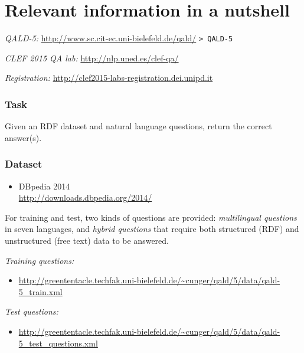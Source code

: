 \documentclass[a4paper]{article}
\begin{document}
{\newpage

\section{Relevant information in a nutshell}

{\em QALD-5:} \url{http://www.sc.cit-ec.uni-bielefeld.de/qald/} \texttt{> QALD-5}

{\em CLEF 2015 QA lab:} \url{http://nlp.uned.es/clef-qa/}

\emph{Registration:} \url{http://clef2015-labs-registration.dei.unipd.it}



\subsubsection*{Task}

Given an RDF dataset and natural language questions, return the correct answer(s). 

\subsubsection*{Dataset}

\begin{itemize} 
\item DBpedia 2014\\ \url{http://downloads.dbpedia.org/2014/}
\end{itemize} 

For training and test, two kinds of questions are provided: 
\emph{multilingual questions} in seven languages, 
and \emph{hybrid questions} that require both structured (RDF) and unstructured (free text) data to be answered.

{\em Training questions:} 

\vspace{-.3cm}

\begin{itemize} 
\item \url{http://greententacle.techfak.uni-bielefeld.de/~cunger/qald/5/data/qald-5_train.xml} 
\end{itemize} 

{\em Test questions:} 

\vspace{-.3cm}

\begin{itemize}
\item \url{http://greententacle.techfak.uni-bielefeld.de/~cunger/qald/5/data/qald-5_test_questions.xml} 
\end{itemize}

}
\end{document}
